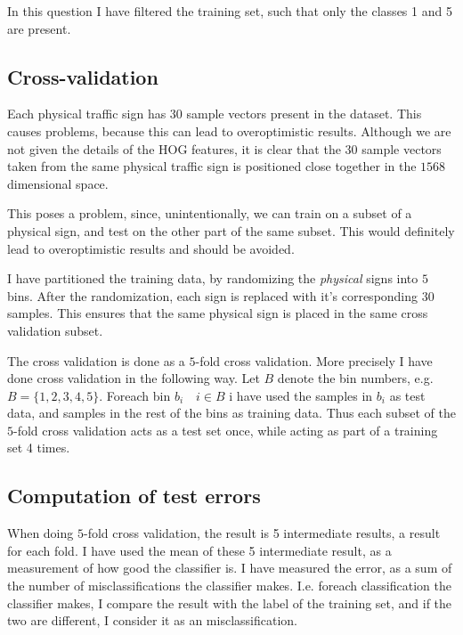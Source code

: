 \documentclass[10pt]{article}
\begin{document}
In this question I have filtered the training set, such that only the classes 1 and 5 are present. 

\subsection*{Cross-validation} %
\label{sub:cross_validation}
Each physical traffic sign has $30$ sample vectors present in the dataset. This causes problems, because this can lead to overoptimistic results. Although we are not given the details of the HOG features, it is clear that the $30$ sample vectors taken from the same physical traffic sign is positioned close together in the $1568$ dimensional space. 

This poses a problem, since, unintentionally, we can train on a subset of a physical sign, and test on the other part of the same subset. This would definitely lead to overoptimistic results and should be avoided.

I have partitioned the training data, by randomizing the \emph{physical} signs into $5$ bins. After the randomization, each sign is replaced with it's corresponding $30$ samples. This ensures that the same physical sign is placed in the same cross validation subset.

The cross validation is done as a $5$-fold cross validation. More precisely I have done cross validation in the following way. Let $B$ denote the bin numbers, e.g. $B = \{1,2,3,4,5\}$. Foreach bin $b_i \quad i \in B$ i have used the samples in $b_i$ as test data, and samples in the rest of the bins as training data. Thus each subset of the $5$-fold cross validation acts as a test set once, while acting as part of a training set 4 times.

\subsection*{Computation of test errors} %
\label{sub:computation_of_test_errors}
When doing $5$-fold cross validation, the result is 5 intermediate results, a result for each fold. I have used the mean of these 5 intermediate result, as a measurement of how good the classifier is. I have measured the error, as a sum of the number of misclassifications the classifier makes. I.e. foreach classification the classifier makes, I compare the result with the label of the training set, and if the two are different, I consider it as an misclassification.
\end{document}
